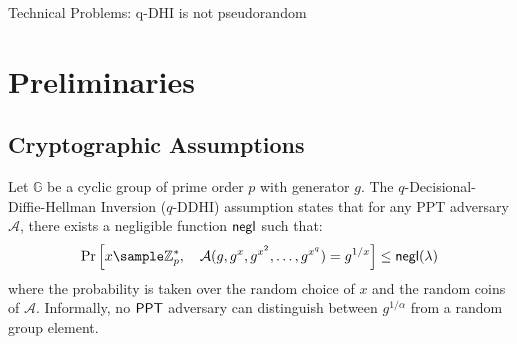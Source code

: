 Technical Problems: 
q-DHI is not pseudorandom


















































































\section{Preliminaries}
\subsection{Cryptographic Assumptions}

\begin{definition}
Let $\mathbb{G}$ be a cyclic group of prime order $p$ with generator $g$. The $q$-Decisional-Diffie-Hellman Inversion ($q$-DDHI) assumption\cite{mitsunari_new_2002} states that for any PPT adversary $\mathcal{A}$, there exists a negligible function $\mathsf{negl}$ such that:
\[
\Pr\left[ x \sample \Zp^*, \quad \mathcal{A}(g, g^x, g^{x^2}, \ldots, g^{x^q}) = g^{1/x} \right] \leq \negl(\lambda)
\]
where the probability is taken over the random choice of $x$ and the random coins of $\mathcal{A}$. Informally, no $\mathsf{PPT}$ adversary can distinguish between $g^{1/\alpha}$ from a random group element.
\end{definition}

